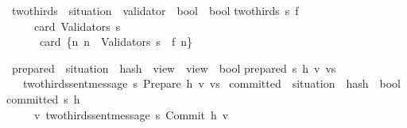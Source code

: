 \documentclass{beamer}
\begin{document}
\renewcommand{\isacharbraceleft}{\{}
\renewcommand{\isacharbraceright}{\}}

\begin{frame}
\isamarkupfalse%
\ two{\isacharunderscore}thirds\ {\isacharcolon}{\isacharcolon}\ {\isachardoublequoteopen}situation\ {\isasymRightarrow}\ {\isacharparenleft}validator\ {\isasymRightarrow}\ bool{\isacharparenright}\ {\isasymRightarrow}\ bool{\isachardoublequoteclose}\isanewline
{}\isanewline
{\isachardoublequoteopen}two{\isacharunderscore}thirds\ s\ f\ {\isacharequal}\isanewline
\ \ \ {\isacharparenleft}{}\ {\isacharasterisk}\ card\ {\isacharparenleft}Validators\ s{\isacharparenright}\ {\isasymle}\\\ \ \ \  {}\ {\isacharasterisk}\ card\ {\isacharparenleft}{\isacharbraceleft}n{\isachardot}\ n\ {\isasymin}\ Validators\ s\ {\isasymand}\ f\ n{\isacharbraceright}{\isacharparenright}{\isacharparenright}{\isachardoublequoteclose}%
\end{frame}

\begin{frame}
\isamarkupfalse%
\ prepared\ {\isacharcolon}{\isacharcolon}\ {\isachardoublequoteopen}situation\ {\isasymRightarrow}\ hash\ {\isasymRightarrow}\ view\ {\isasymRightarrow}\ view\ {\isasymRightarrow}\ bool{\isachardoublequoteclose}\isanewline
{}\isanewline
{\isachardoublequoteopen}prepared\ s\ h\ v\ vs\ {\isacharequal}\isanewline
\ \ \ {\isacharparenleft}two{\isacharunderscore}thirds{\isacharunderscore}sent{\isacharunderscore}message\ s\ {\isacharparenleft}Prepare\ {\isacharparenleft}h{\isacharcomma}\ v{\isacharcomma}\ vs{\isacharparenright}{\isacharparenright}{\isacharparenright}{\isachardoublequoteclose}%
\vfill
{}\isamarkupfalse%
\ committed\ {\isacharcolon}{\isacharcolon}\ {\isachardoublequoteopen}situation\ {\isasymRightarrow}\ hash\ {\isasymRightarrow}\ bool{\isachardoublequoteclose}\isanewline
{}\isanewline
           {\isachardoublequoteopen}committed\ s\ h\ {\isacharequal}\\
           \ \ \ \ {\isacharparenleft}{\isasymexists}\ v{\isachardot}\ two{\isacharunderscore}thirds{\isacharunderscore}sent{\isacharunderscore}message\ s\ {\isacharparenleft}Commit\ {\isacharparenleft}h{\isacharcomma}\ v{\isacharparenright}{\isacharparenright}{\isacharparenright}{\isachardoublequoteclose}%
\isamarkuptrue%
%
\end{frame}
\end{document}
